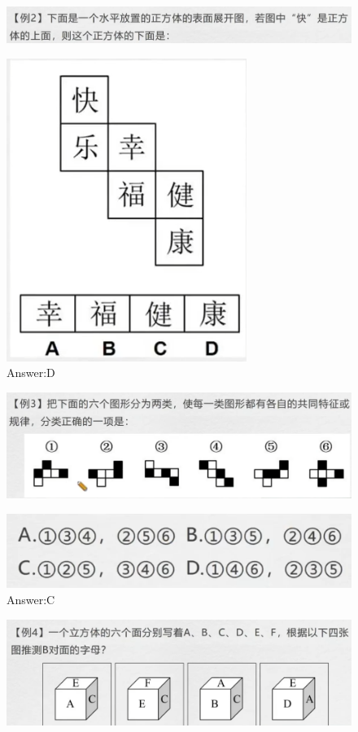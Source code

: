 \documentclass{article}
\numberwithin{equation}{section}						%
\numberwithin{figure}{section}							%
\begin{document}
\begin{sloppypar}
\begin{figure}[H]
     \centering
     \includegraphics[width=0.4\linewidth]{91.png}
\end{figure}

\begin{figure}[H]
     \centering
     \includegraphics[width=0.3\linewidth]{90.png}
		\caption{Answer:D}
\end{figure}



\begin{figure}[H]
     \centering
     \includegraphics[width=0.6\linewidth]{92.png}
		
\end{figure}

\begin{figure}[H]
     \centering
     \includegraphics[width=0.6\linewidth]{93.png}
		\caption{Answer:C}
\end{figure}


\begin{figure}[H]
     \centering
     \includegraphics[width=0.6\linewidth]{94.png}
	

\end{figure}
\end{sloppypar}
\end{document}
